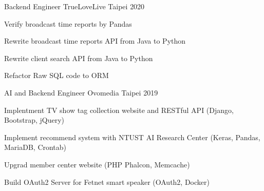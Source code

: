 

\begin{cventries}

  \cventry
    {Backend Engineer} %
    {TrueLoveLive} %
    {Taipei} %
    {2020} %
    {
      \begin{cvitems} %
        \item {Verify broadcast time reports by Pandas}
        \item {Rewrite broadcast time reports API from Java to Python}
        \item {Rewrite client search API from Java to Python}
        \item {Refactor Raw SQL code to ORM}
      \end{cvitems}
    }

  \cventry
    {AI and Backend Engineer} %
    {Ovomedia} %
    {Taipei} %
    {2019} %
    {
      \begin{cvitems} %
      \item {Implentment TV show tag collection website and RESTful API (Django, Bootstrap, jQuery)}
        \item {Implement recommend system with NTUST AI Research Center (Keras, Pandas, MariaDB, Crontab)}
        \item {Upgrad member center website (PHP Phalcon, Memcache)}
        \item {Build OAuth2 Server for Fetnet smart speaker (OAuth2, Docker)}
      \end{cvitems}
    }

\end{cventries}

